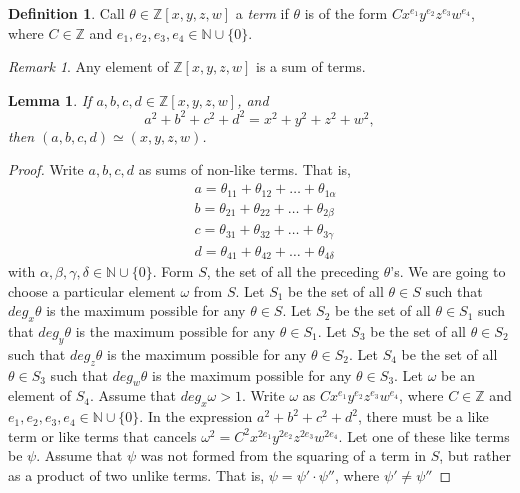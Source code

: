 \documentclass[12pt]{article}
\newtheorem{lemma}[theorem]{Lemma}
\theoremstyle{definition}
\newtheorem{definition}[theorem]{Definition}
\theoremstyle{remark}
\newtheorem{remark}[theorem]{Remark}
\newcommand{\Nnn}{\mathbb N}
\newcommand{\Zzz}{\mathbb Z}
\numberwithin{equation}{section}
\begin{document}
\begin{definition}
Call \( \theta \in \Zzz[x,y,z,w] \) a \emph{term} if \( \theta \)
is of the form \(Cx^{e_1}y^{e_2}z^{e_3}w^{e_4}\), where \( C \in \Zzz \)
and \( e_1,e_2,e_3,e_4 \in \Nnn \cup \{0\} \). 
\end{definition}
\begin{remark}
Any element of \( \Zzz[x,y,z,w] \) is a sum of terms.
\end{remark}
\begin{lemma}
If \(a, b, c, d \in \Zzz[x,y,z,w]\), and
\[
a^2 + b^2 + c^2 + d^2 = x^2 + y^2 + z^2 + w^2,
\]
then \( (a, b, c, d ) \simeq (x, y, z, w )\).
\end{lemma}
\begin{proof}
Write \( a,b,c,d \) as sums of non-like terms. That is,
\begin{align*}
&a = \theta_{11} + \theta_{12} + \ldots + \theta_{1\alpha}
\\
&b = \theta_{21} + \theta_{22} + \ldots + \theta_{2\beta}
\\
&c = \theta_{31} + \theta_{32} + \ldots + \theta_{3\gamma}
\\
&d = \theta_{41} + \theta_{42} + \ldots + \theta_{4\delta}
\end{align*}
with \( \alpha,\beta,\gamma,\delta \in \Nnn \cup \{ 0 \} \).
Form \(S\), the set of all the preceding \( \theta \)'s.
We are going to choose a particular element \( \omega \)
from \( S \).
Let \( S_1 \) be the set of all \( \theta \in S  \) such that
\( deg_x \theta \) is the maximum possible for any \( \theta \in S \).
Let \( S_2 \) be the set of all \( \theta \in S_1  \) such that
\( deg_y \theta \) is the maximum possible for any \( \theta \in S_1 \).
Let \( S_3 \) be the set of all \( \theta \in S_2  \) such that
\( deg_z \theta \) is the maximum possible for any \( \theta \in S_2 \).
Let \( S_4 \) be the set of all \( \theta \in S_3  \) such that
\( deg_w \theta \) is the maximum possible for any \( \theta \in S_3 \).
Let \( \omega \) be an element of \( S_4 \). Assume that \(deg_x \omega > 1 \).
Write \( \omega \) as \(Cx^{e_1}y^{e_2}z^{e_3}w^{e_4}\), where \( C \in \Zzz \)
and \( e_1,e_2,e_3,e_4 \in \Nnn \cup \{0\} \). In the expression  
\(a^2 + b^2 + c^2 + d^2\), there must be a like term or like terms
that cancels \( \omega^2 = C^2x^{2e_1}y^{2e_2}z^{2e_3}w^{2e_4}\).
Let one of these like terms be \( \psi \). Assume that \( \psi \)
was not formed from the squaring of a term in \(S\), but rather
as a product of two unlike terms.
That is, \( \psi = \psi' \cdot \psi''\), where \( \psi' \neq \psi'' \)

\end{proof}
\end{document}
